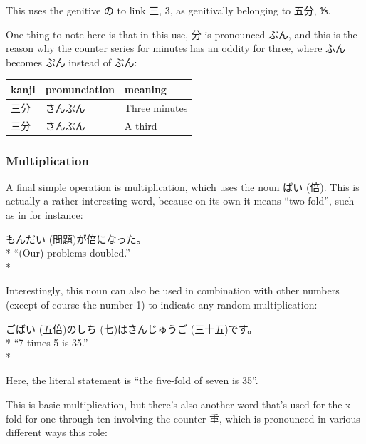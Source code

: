 \documentclass[11pt, b5paper, twoside, openright, onecolumn]{book}
\makeatletter
\newcommand*{\rubystack}[2]{{\relscale{0.5}%
  \begin{tabular}[b]{@{}c@{}}%
    {#1}\\%
   {\textscale{2}{#2}}%
  \end{tabular}}%
}
\DeclareRobustCommand*{\ruby}[2]{%
  \mbox{%
    \setlength{\parskip}{0ex}%
    \BeginAccSupp{method=pdfstringdef,ActualText={#1}}%
      \rubystack{\phantom{#2}}{#1}%
      \llap{%
        \rubystack{#2}{\phantom{#1}}%
      }%
    \EndAccSupp{}%
  }%
}
\renewcommand*{\ruby}[2]{#2 (#1)}%
\newenvironment{exampleblock}{
\setlength{\parindent}{0.6in}
\begin{minipage}[t]{\dimexpr\textwidth-\parindent}}
{\end{minipage}}
\newenvironment{mytabular}[1]{\noindent\hspace{0.4in}
\begin{tabular}[h]{#1}}{\end{tabular}}
\makeatother
\begin{document}
This uses the genitive の to link 三‚ 3‚ as genitivally belonging to 五分‚ ⅕.

One thing to note here is that in this use‚ 分 is pronounced ぶん‚ and this is the reason why the counter series for minutes has an oddity for three‚ where ふん becomes ぷん instead of ぶん:

\vspace{0.5cm}
\smaller
\begin{mytabular}{| l  l  l |}\hline 
\rule{0pt}{2.4ex}kanji & pronunciation & meaning\\ 
\hline
\rule{0pt}{2.4ex}三分 & さんぷん & Three minutes\\ 
\rule{0pt}{2.4ex}三分 & さんぶん & A third\\ 
\hline 
\end{mytabular}
\larger
\subsubsection{Multiplication}


A final simple operation is multiplication‚ which uses the noun \ruby{倍}{ばい}. This is actually a rather interesting word‚ because on its own it means “two fold”‚ such as in for instance:

\vspace{0.4cm}
\begin{exampleblock}
\ruby{問題}{もんだい}が倍になった。 \\* 
“(Our) problems doubled.” \\* 
\end{exampleblock}
\vspace{0.2cm}

Interestingly‚ this noun can also be used in combination with other numbers (except of course the number 1) to indicate any random multiplication:

\vspace{0.4cm}
\begin{exampleblock}
\ruby{五倍}{ごばい}の\ruby{七}{しち}は\ruby{三十五}{さんじゅうご}です。 \\* 
“7 times 5 is 35.” \\* 
\end{exampleblock}
\vspace{0.2cm}

Here‚ the literal statement is “the five-fold of seven is 35”.

This is basic multiplication‚ but there’s also another word that’s used for the x-fold for one through ten involving the counter 重‚ which is pronounced in various different ways this role:
\end{document}
